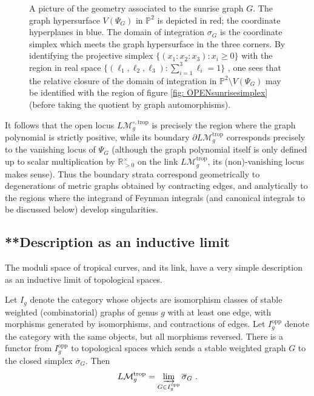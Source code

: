 \documentclass[12pt]{amsart}
\newcommand{\RR}{{\mathbb R}}
\theoremstyle{plain}
\newcommand{\LM}{L\mathcal{M}}
\newcommand{\trop}{\mathrm{trop}}
\newcommand{\0}{\color{blue}{\mathsf{0}}}
\begin{document}
\begin{figure}[h]
\caption{A picture of the geometry associated to the sunrise graph $G$. The graph hypersurface $V(\Psi_G)$ in $\mathbb{P}^2$ is depicted in red; the coordinate hyperplanes in blue. The domain of integration $\sigma_G$ is the coordinate simplex which meets the graph hypersurface in the three corners. By identifying the projective simplex $\{(x_1: x_2: x_3) : x_i \geq 0\}$ with  the region in real space $\{(\ell_1,\ell_2,\ell_3): \sum_{i=1}^3 \ell_i =1\}$ , one sees that the relative closure of the domain of integration in $\mathbb{P}^2 \setminus V(\Psi_G)$ may be identified with the region of figure \ref{fig: OPENsunrisesimplex}  (before taking the quotient by graph automorphisms).   }\label{fig3} 
\end{figure}





It follows that the open locus $\LM_g^{\circ, \trop}$ is precisely the region where the graph polynomial is strictly positive, while its  boundary $\partial \LM_g^{\trop}$  corresponds precisely to the vanishing locus of $\Psi_G$  (although the graph polynomial itself is only defined  up to scalar multiplication by $\RR_{>0}^{\times}$ on the link $\LM_g^{\trop}$, its (non)-vanishing locus makes sense). Thus   the boundary strata correspond geometrically to degenerations of metric graphs obtained by contracting edges, and analytically to  the regions where the integrand of Feynman integrals (and canonical integrals to be discussed below) develop singularities.

\subsection{**Description as an inductive limit}
The moduli space of tropical curves, and its link, have a very simple description as an inductive limit of topological spaces. 

Let $I_g$ denote the category whose objects are isomorphism classes of stable weighted (combinatorial) graphs of genus $g$ with at least one edge, with morphisms generated by isomorphisms, and contractions of edges. Let $I_g^{\mathrm{opp}}$ denote the category with the same objects, but all morphisms reversed. There is a functor from 
$I_g^{\mathrm{opp}}$ to topological spaces which sends a stable weighted graph $G$ to the closed simplex $\overline{\sigma}_G$. Then 
\[ \LM_g^{\trop} = \varinjlim_{G \in I_g^{\mathrm{opp}}} \overline{\sigma}_G \ .  \]
\end{document}
